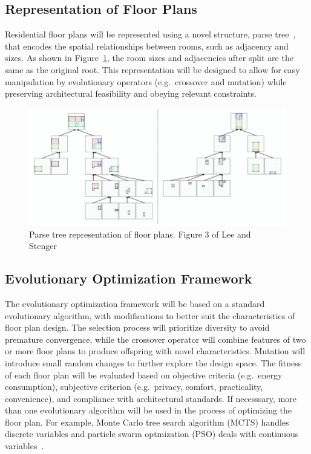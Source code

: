 \documentclass[]{article}
\begin{document}
\subsection{Representation of Floor Plans}
Residential floor plans will be represented using a novel structure, parse tree~\cite{9511363}, that encodes the spatial relationships between rooms, such as adjacency and sizes. As shown in Figure~\ref{fig1}, the room sizes and adjacencies after split are the same as the original root. This representation will be designed to allow for easy manipulation by evolutionary operators (e.g.~crossover and mutation) while preserving architectural feasibility and obeying relevant constraints.
\begin{figure}
  \centering
  \includegraphics[width=\textwidth]{image2.png}
  \caption{Parse tree representation of floor plans. Figure 3 of Lee and Stenger~\cite{9511363}}\label{fig1}
\end{figure}

\subsection{Evolutionary Optimization Framework}
The evolutionary optimization framework will be based on a standard evolutionary algorithm, with modifications to better suit the characteristics of floor plan design. The selection process will prioritize diversity to avoid premature convergence, while the crossover operator will combine features of two or more floor plans to produce offspring with novel characteristics. Mutation will introduce small random changes to further explore the design space. The fitness of each floor plan will be evaluated based on objective criteria (e.g.\ energy consumption), subjective criterion (e.g.\ privacy, comfort, practicality, convenience), and compliance with architectural standards. If necesssary, more than one evolutionary algorithm will be used in the process of optimizing the floor plan. For example, Monte Carlo tree search algorithm (MCTS) handles discrete variables and particle swarm optmization (PSO) deals with continuous variables~\cite{YAN2024110546}.
\end{document}
